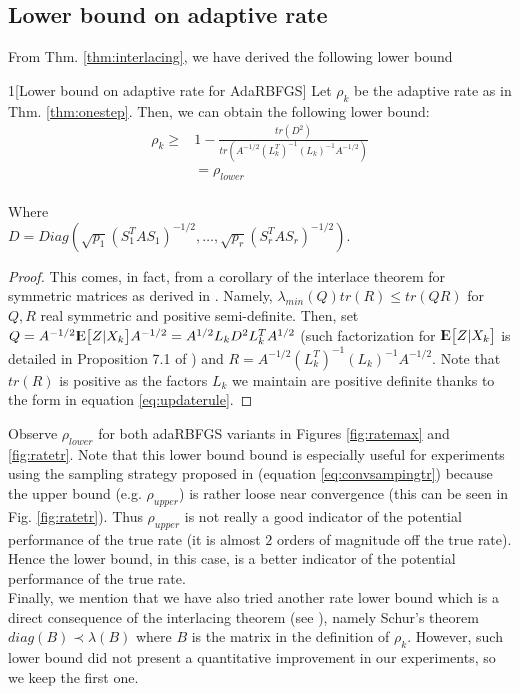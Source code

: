 \documentclass[12pt,conference,compsocconf]{IEEEtran}
\newcommand{\E}{{\rm I\kern-.3em E}}
\begin{document}
\subsection{Lower bound on adaptive rate}\label{sect:adaptive rate}
From Thm. \ref{thm:interlacing}, we have derived the following lower bound
\begin{customthm}{1}[Lower bound on adaptive rate for AdaRBFGS] \label{thm:lowerbada}
Let $\rho_k$ be the adaptive rate as in Thm. \ref{thm:onestep}. Then, we can obtain the following lower bound:\\
\begin{align}\label{eq:lowerbada}
	\rho_k \geq &1-\frac{tr(D^2)}{tr(A^{-1/2}(L_k^T)^{-1} (L_k)^{-1}A^{-1/2})}\\ \nonumber
    &=\rho_{lower} \nonumber
\end{align}
\\ Where\\ $D=Diag(\sqrt{p_1}(S_1^TAS_1)^{-1/2},\ldots,\sqrt{p_r}(S_r^TAS_r)^{-1/2})$.

\begin{proof}
This comes, in fact, from a corollary of the interlace theorem for symmetric matrices as derived in \cite{J Tao,Fang}. Namely, $\lambda_{min}(Q)tr(R)\leq tr(QR)$ for $Q,R$ real symmetric and positive semi-definite. Then, set $Q=A^{-1/2}\E\big[Z|X_k\big]A^{-1/2}=A^{1/2}L_kD^{2}L_k^TA^{1/2}$ (such factorization for $\E\big[Z|X_k\big]$ is detailed in Proposition 7.1 of \cite{Gower1}) and $R=A^{-1/2}(L_k^T)^{-1} (L_k)^{-1}A^{-1/2}$. Note that $tr(R)$ is positive as the factors $L_k$ we maintain are positive definite thanks to the form in equation \ref{eq:updaterule}.
\end{proof}
\end{customthm}
Observe $\rho_{lower}$ for both adaRBFGS variants in Figures \ref{fig:ratemax} and \ref{fig:ratetr}. Note that this lower bound bound is especially useful for experiments using the sampling strategy proposed in \cite{Gower1} (equation \ref{eq:convsampingtr}) because the upper bound (e.g. $\rho_{upper}$) is rather loose near convergence (this can be seen in Fig. \ref{fig:ratetr}). Thus $\rho_{upper}$ is not really a good indicator of the potential performance of the true rate (it is almost $2$ orders of magnitude off the true rate). Hence the lower bound, in this case, is a better indicator of the potential performance of the true rate.\\
Finally, we mention that we have also tried another rate lower bound which is a direct consequence of the interlacing theorem (see \cite{J Tao}), namely Schur's theorem $diag(B) \prec \lambda(B)$ where $B$ is the matrix in the definition of $\rho_k$. However, such lower bound did not present a quantitative improvement in our experiments, so we keep the first one.
\end{document}
